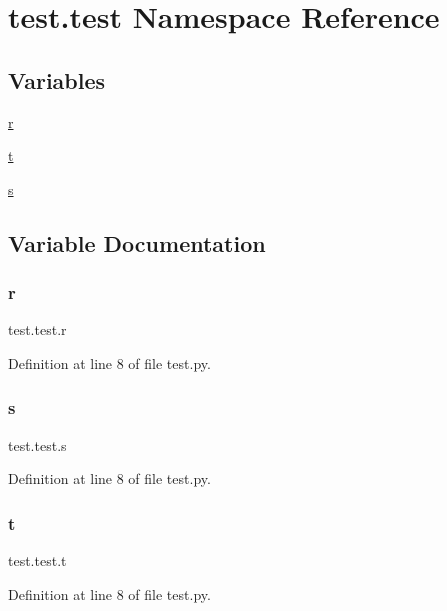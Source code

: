 \hypertarget{namespacetest_1_1test}{}\section{test.\+test Namespace Reference}
\label{namespacetest_1_1test}
\subsection*{Variables}
\begin{DoxyCompactItemize}
\item 
\hyperlink{namespacetest_1_1test_ac6940ca06224277c08c299101b3296b4}{r}
\item 
\hyperlink{namespacetest_1_1test_a85ce85cce39e2fad621db9c70186235a}{t}
\item 
\hyperlink{namespacetest_1_1test_a4e3f76bc561357031de5269619280f91}{s}
\end{DoxyCompactItemize}


\subsection{Variable Documentation}
\mbox{\label{namespacetest_1_1test_ac6940ca06224277c08c299101b3296b4}} 
\subsubsection{\texorpdfstring{r}{r}}
{\footnotesize\ttfamily test.\+test.\+r}



Definition at line 8 of file test.\+py.

\mbox{\label{namespacetest_1_1test_a4e3f76bc561357031de5269619280f91}} 
\subsubsection{\texorpdfstring{s}{s}}
{\footnotesize\ttfamily test.\+test.\+s}



Definition at line 8 of file test.\+py.

\mbox{\label{namespacetest_1_1test_a85ce85cce39e2fad621db9c70186235a}} 
\subsubsection{\texorpdfstring{t}{t}}
{\footnotesize\ttfamily test.\+test.\+t}



Definition at line 8 of file test.\+py.


